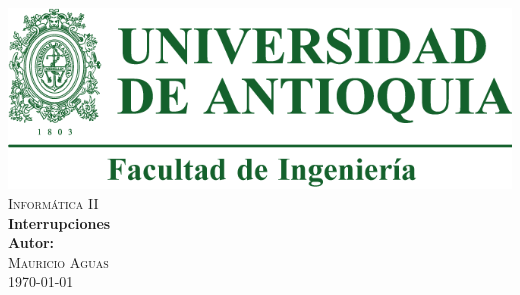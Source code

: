 \documentclass{article}
\begin{document}
\begin{titlepage}


\center %

\includegraphics[scale=0.5]{Udea.png}\\[2cm] 

\textsc{\Large Informática II}\\[2cm] 

{ \huge \bfseries Interrupciones}\\[3cm]

\textbf{Autor:}\\ 
\textsc{Mauricio Aguas}\\[4cm] 


{\large \today}\\[2cm]

\vfill 

\end{titlepage}

\newpage


\vspace{1mm}



\vspace{2mm}


\vspace{2mm}



\vspace{2mm}



\vspace{2mm}



\vspace{2mm}


\vspace{2mm}


\vspace{2mm} 

\newpage

\begin{thebibliography}{X}



\end{thebibliography}
\end{document}
